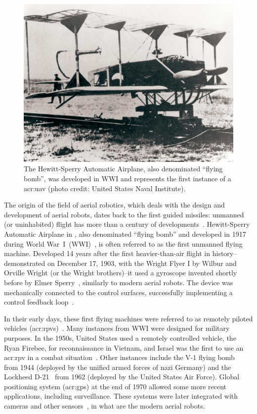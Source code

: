 \begin{figure}[t]
  \centering
  \includegraphics[width=.7\textwidth]{pictures/HA-NH-JA-19_1}
  \caption[Hewitt-Sperry Automatic Airplane, first unmanned flying machine]{The Hewitt-Sperry Automatic Airplane, also denominated ``flying bomb'', was developed in WWI and represents the first instance of a \Gls{acr:uav} {\scriptsize(photo credit: United States Naval Institute)}.}   
  \label{fig:hewitt-sperry}
\end{figure}
The origin of the field of aerial robotics, which deals with the design and development of aerial robots, dates back to the first guided missiles: unmanned (or uninhabited) flight has more than a century of developments~\citep{siciliano2016springer}. Hewitt-Sperry Automatic Airplane in , also denominated ``flying bomb'' and developed in 1917 during World War~I~(WWI)~\citep{keane2013brief,valavanis2015handbook}, is often referred to as the first unmanned flying machine. Developed 14 years after the first heavier-than-air flight in history--demonstrated on December 17, 1903, with the Wright Flyer I by Wilbur and Orville Wright (or the Wright brothers)--it used a gyroscope invented shortly before by Elmer Sperry~\citep{keane2013brief}, similarly to modern aerial robots. The device was mechanically connected to the control surfaces, successfully implementing a control feedback loop~\citep{siciliano2016springer}.

In their early days, these first flying machines were referred to as remotely piloted vehicles (\Gls{acr:rpv}s)~\citep{anderson2005introduction}. Many instances from WWI were designed for military purposes. In the 1950s, United States used a remotely controlled vehicle, the Ryan Firebee, for reconnaissance in Vietnam, and Israel was the first to use an \Gls{acr:rpv} in a combat situation~\citep{anderson2005introduction}. Other instances include the V-1 flying bomb~ from 1944 (deployed by the unified armed forces of nazi Germany) and the Lockheed D-21~ from 1962 (deployed by the United States Air Force). Global positioning system (\Gls{acr:gps}) at the end of 1970 allowed some more recent applications, including surveillance. These systems were later integrated with cameras and other sensors~\citep{siciliano2016springer}, in what are the modern aerial robots.

